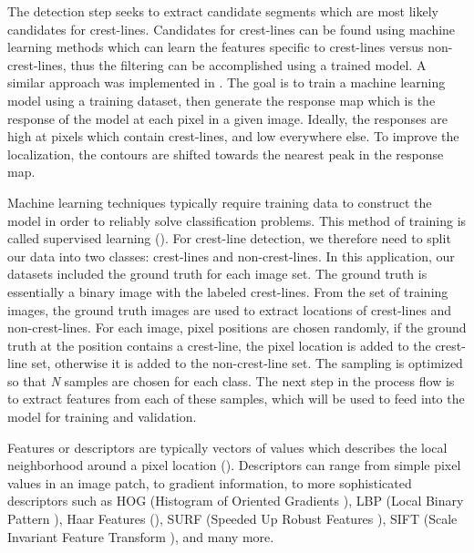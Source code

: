 The detection step seeks to extract candidate segments which are most likely candidates for crest-lines. Candidates for crest-lines can be found using machine learning methods which can learn the features specific to crest-lines versus non-crest-lines, thus the filtering can be accomplished using a trained model. A similar approach was implemented in \cite{2006_automated_classification_landform_elements,2007_Machine_Learning_tools_automatic_mapping_mars,2013_sar_image_automated_detection_dune_area,BandeiraMarques,2011_neural_network_based_dunal_landform_mapping,vaz_object_based_dune_analysis}. The goal is to train a machine learning model using a training dataset, then generate the response map which is the response of the model at each pixel in a given image. Ideally, the responses are high at pixels which contain crest-lines, and low everywhere else. To improve the localization, the contours are shifted towards the nearest peak in the response map.

Machine learning techniques typically require training data to construct the model in order to reliably solve classification problems. This method of training is called supervised learning (\cite{foundations_machine_learning_book,machine_learning_book}). For crest-line detection, we therefore need to split our data into two classes: crest-lines and non-crest-lines. In this application, our datasets included the ground truth for each image set. The ground truth is essentially a binary image with the labeled crest-lines. From the set of training images, the ground truth images are used to extract locations of crest-lines and non-crest-lines. For each image, pixel positions are chosen randomly, if the ground truth at the position contains a crest-line, the pixel location is added to the crest-line set, otherwise it is added to the non-crest-line set. The sampling is optimized so that \emph{N} samples are chosen for each class. The next step in the process flow is to extract features from each of these samples, which will be used to feed into the model for training and validation.

Features or descriptors are typically vectors of values which describes the local neighborhood around a pixel location (\cite{lowe_sift_paper,1994_good_features_to_track,1998_feature_detection,2007_invariant_features_survey}). Descriptors can range from simple pixel values in an image patch, to gradient information, to more sophisticated descriptors such as HOG (Histogram of Oriented Gradients \cite{2007_hog_human_detection}), LBP (Local Binary Pattern \cite{1994_lbp_paper,1996_lbp_paper}), Haar Features (\cite{2001_viola_jones_paper}), SURF (Speeded Up Robust Features \cite{2006_surf}), SIFT (Scale Invariant Feature Transform \cite{lowe_sift_paper}), and many more. 

